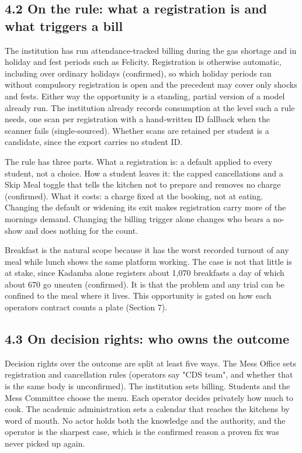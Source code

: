 \documentclass[
  10pt,
  table]{article}
\begin{document}
\subsection{4.2 On the rule: what a registration is and what triggers a bill}\label{on-the-rule-what-a-registration-is-and-what-triggers-a-bill}

The institution has run attendance-tracked billing during the gas shortage and in holiday and fest periods such as Felicity. Registration is otherwise automatic, including over ordinary holidays (confirmed), so which holiday periods ran without compulsory registration is open and the precedent may cover only shocks and fests. Either way the opportunity is a standing, partial version of a model already run. The institution already records consumption at the level such a rule needs, one scan per registration with a hand-written ID fallback when the scanner fails (single-sourced). Whether scans are retained per student is a candidate, since the export carries no student ID.

The rule has three parts. What a registration is: a default applied to every student, not a choice. How a student leaves it: the capped cancellations and a Skip Meal toggle that tells the kitchen not to prepare and removes no charge (confirmed). What it costs: a charge fixed at the booking, not at eating. Changing the default or widening its exit makes registration carry more of the morning\textquotesingle s demand. Changing the billing trigger alone changes who bears a no-show and does nothing for the count.

Breakfast is the natural scope because it has the worst recorded turnout of any meal while lunch shows the same platform working. The case is not that little is at stake, since Kadamba alone registers about 1,070 breakfasts a day of which about 670 go uneaten (confirmed). It is that the problem and any trial can be confined to the meal where it lives. This opportunity is gated on how each operator\textquotesingle s contract counts a plate (Section 7).

\subsection{4.3 On decision rights: who owns the outcome}\label{on-decision-rights-who-owns-the-outcome}

Decision rights over the outcome are split at least five ways. The Mess Office sets registration and cancellation rules (operators say "CDS team", and whether that is the same body is unconfirmed). The institution sets billing. Students and the Mess Committee choose the menu. Each operator decides privately how much to cook. The academic administration sets a calendar that reaches the kitchens by word of mouth. No actor holds both the knowledge and the authority, and the operator is the sharpest case, which is the confirmed reason a proven fix was never picked up again.
\end{document}
